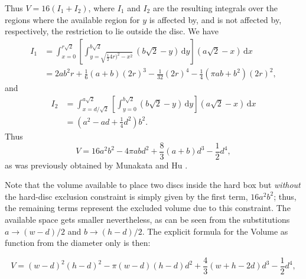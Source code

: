 \documentclass[a4paper,10pt, jcp, aps, preprint]{revtex4-1}
\newcommand{\rd}{\, \mathrm{d}}
\begin{document}
Thus $V = 16(I_1 + I_2)$, where $I_1$ and $I_2$ are the resulting integrals over the regions where the available region for $y$ is affected by, and is not affected by, respectively, the restriction to lie outside the disc.
We have
\begin{align}
 I_1 &= \int_{x=0}^{r\sqrt{2}} \left[ \int_{y = \sqrt{\frac{1}{2} {4r)^2} - x^2}}^{b \sqrt{2}} \left( b \sqrt{2} - y \right) \rd y \right]  \left( a \sqrt{2} - x \right) \rd x \\
&= 	
2 a b^{2} r  + \textstyle \frac{1}{6} (a+b) (2r)^{3} - \frac{1}{32}  (2r)^{4} - \frac{1}{4} {\left(\pi a b + b^{2}\right)} (2r)^2,
\end{align}
and
\begin{align}
 I_2 &= \int_{x=d / \sqrt{2}}^{a \sqrt{2}} \left[ \int_{y = 0}^{b \sqrt{2}} \left( b \sqrt{2} - y \right) \rd y \right]  \left( a \sqrt{2} - x \right) \rd x \\
&=	
{\left( a^{2} - a d + \textstyle \frac{1}{4}  d^{2}\right)} b^{2}.
\end{align}
Thus 
\begin{equation}\label{volumeabd}
 V %
= 16 a^{2} b^{2}  - 4 \pi a b d^{2} + \textstyle \frac{8}{3} (a+b) d^{3}  - \frac{1}{2} d^{4},
\end{equation}
as was previously obtained by Munakata and Hu \cite{Munakata02}.

Note that the volume available to place two discs inside 
the hard box but \emph{without} the 
 hard-disc exclusion constraint is simply 
given by the first term, $16 a^2 b^2$; 
thus, the remaining terms represent the excluded volume due to this constraint.
The available space gets smaller nevertheless, as can be seen from
the substitutions $a\rightarrow (w-d)/2$ and $b\rightarrow (h-d)/2$.
The explicit formula for the Volume as function from the diameter only is then:

\begin{equation}\label{volumewhd}
 V 
= (w-d)^{2} (h-d)^{2}  - 
 \pi (w-d)(h-d) d^{2} + 
\textstyle \frac{4}{3} (w+h-2d) d^{3}  
- \frac{1}{2} d^{4},
\end{equation}
 
\end{document}
